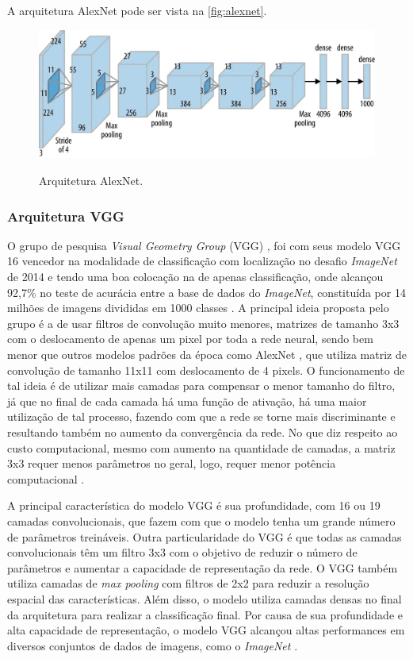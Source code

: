 A arquitetura AlexNet pode ser vista na \autoref{fig:alexnet}.

\begin{figure}[htb]
    \centering
    \caption{Arquitetura AlexNet.}
    \includegraphics[width=1\linewidth]{images/alexnet.jpg}
    \label{fig:alexnet}
\end{figure}


\subsubsection{Arquitetura VGG}
O grupo de pesquisa \textit{Visual Geometry Group} (VGG) \cite{simonyan2014very}, foi com seus modelo VGG 16 vencedor na modalidade de classificação com localização no desafio \textit{ImageNet} de 2014 e tendo uma boa colocação na de apenas classificação, onde alcançou 92,7\% no teste de acurácia entre a base de dados do \textit{ImageNet}, constituída por 14 milhões de imagens divididas em 1000 classes \cite{ILSVRC15}. 
A principal ideia proposta pelo grupo é a de usar filtros de convolução muito menores, matrizes de tamanho 3x3 com o deslocamento de apenas um pixel por toda a rede neural, sendo bem menor que outros modelos padrões da época como AlexNet \cite{krizhevsky2017imagenet}, que utiliza matriz de convolução de tamanho 11x11 com deslocamento de 4 pixels.
O funcionamento de tal ideia é de utilizar mais camadas para compensar o menor tamanho do filtro, já que no final de cada camada há uma função de ativação, há uma maior utilização de tal processo, fazendo com que a rede se torne mais discriminante  e resultando também no aumento da convergência da rede.
No que diz respeito ao custo computacional, mesmo com aumento na quantidade de camadas, a matriz 3x3 requer menos parâmetros no geral, logo, requer menor potência computacional \cite{GreatLearningVgg16}.


A principal característica do modelo VGG é sua profundidade, com 16 ou 19 camadas convolucionais, que fazem com que o modelo tenha um grande número de parâmetros treináveis. 
Outra particularidade do VGG é que todas as camadas convolucionais têm um filtro 3x3 com o objetivo de reduzir o número de parâmetros e aumentar a capacidade de representação da rede. 
O VGG também utiliza camadas de \textit{max pooling} com filtros de 2x2 para reduzir a resolução espacial das características. 
Além disso, o modelo utiliza camadas densas no final da arquitetura para realizar a classificação final. 
Por causa de sua profundidade e alta capacidade de representação, o modelo VGG alcançou altas performances em diversos conjuntos de dados de imagens, como o \textit{ImageNet} \cite{simonyan2014very}.

